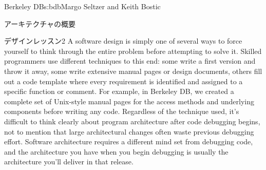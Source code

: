 \begin{aosachapter}{Berkeley DB}{s:bdb}{Margo Seltzer and Keith Bostic}
\begin{aosasect1}{アーキテクチャの概要}
\begin{aosabox}{デザインレッスン2}
A software design is simply one of several ways to force yourself to
think through the entire problem before attempting to solve it.
Skilled programmers use different techniques to this end: some write a
first version and throw it away, some write extensive manual pages or
design documents, others fill out a code template where every
requirement is identified and assigned to a specific function or
comment. For example, in Berkeley DB, we created a complete set of
Unix-style manual pages for the access methods and underlying
components before writing any code. Regardless of the technique used,
it's difficult to think clearly about program architecture after code
debugging begins, not to mention that large architectural changes
often waste previous debugging effort. Software architecture requires
a different mind set from debugging code, and the architecture you
have when you begin debugging is usually the architecture you'll
deliver in that release.

\end{aosabox}



\end{aosasect1}
\end{aosachapter}
